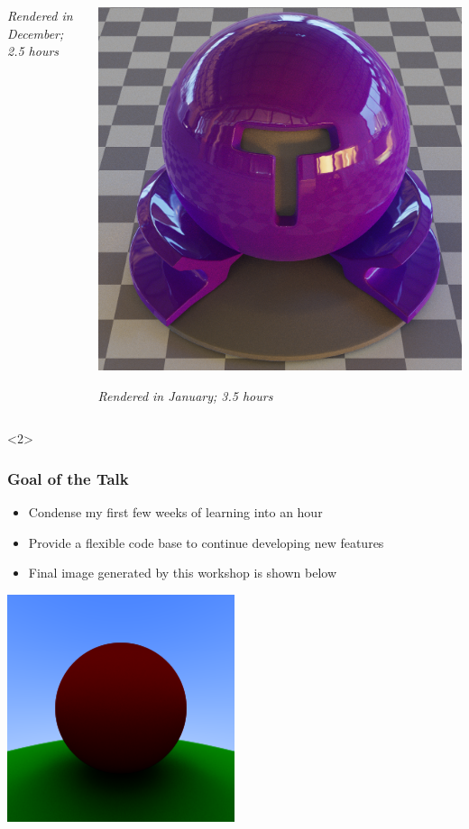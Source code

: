 \documentclass{beamer}
\begin{document}
\begin{frame}
{\begin{columns}[T]
\begin{column}{0.5\textwidth}
				\textit{Rendered in December; 2.5 hours}
			\end{column}
			\begin{column}{0.5\textwidth}
				\centering
				\includegraphics[width=\textwidth]{media/material_sqr.png}
	
				\textit{Rendered in January; 3.5 hours}
			\end{column}
		\end{columns}
	}<2>
	
\end{frame}

\begin{frame}
	\frametitle{Goal of the Talk}
	\begin{itemize}
		\item Condense my first few weeks of learning into an hour
		\item Provide a flexible code base to continue developing new features
		\item Final image generated by this workshop is shown below
	\end{itemize}
	\begin{center}
		\includegraphics[width=0.5\textwidth]{media/final.png}
	\end{center}
\end{frame}
\end{document}
